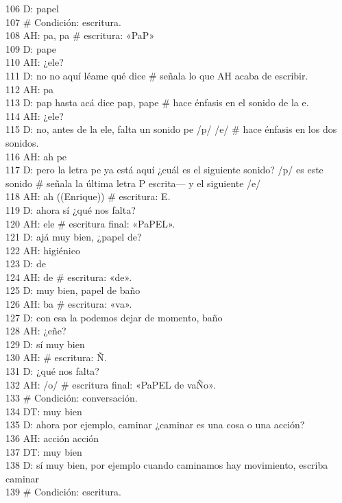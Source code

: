 106 D: papel\\
107 \# Condición: escritura.\\
108 AH: pa, pa \# escritura: «PaP»\\
109 D: pape\\
110 AH: ¿ele?\\
111 D: no no aquí léame qué dice \# señala lo que AH acaba de escribir.\\
112 AH: pa\\
113 D: pap hasta acá dice pap, pape \# hace énfasis en el sonido de la e.\\
114 AH: ¿ele?\\
115 D: no, antes de la ele, falta un sonido pe /p/ /e/ \# hace énfasis en los dos sonidos.\\
116 AH: ah pe\\
117 D: pero la letra pe ya está aquí ¿cuál es el siguiente sonido? /p/ es este sonido \# señala la última letra P escrita--- y el siguiente /e/\\
118 AH: ah ((Enrique)) \# escritura: E.\\
119 D: ahora sí ¿qué nos falta?\\
120 AH: ele \# escritura final: «PaPEL».\\
121 D: ajá muy bien, ¿papel de?\\
122 AH: higiénico\\
123 D: de\\
124 AH: de \# escritura: «de».\\
125 D: muy bien, papel de baño\\
126 AH: ba \# escritura: «va».\\
127 D: con esa la podemos dejar de momento, baño\\
128 AH: ¿eñe?\\
129 D: sí muy bien\\
130 AH: \# escritura: Ñ.\\
131 D: ¿qué nos falta?\\
132 AH: /o/ \# escritura final: «PaPEL de vaÑo».\\
133 \# Condición: conversación.\\
134 DT: muy bien\\
135 D: ahora por ejemplo, caminar ¿caminar es una cosa o una acción?\\
136 AH: acción acción\\
137 DT: muy bien\\
138 D: sí muy bien, por ejemplo cuando caminamos hay movimiento, escriba caminar\\
139 \# Condición: escritura.\\
